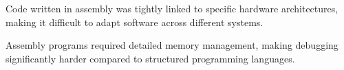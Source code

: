 \begin{NxSSSSBox}
    \begin{NxIDBox}[title={Challenges in Portability}]
        Code written in assembly was tightly linked to specific hardware architectures, making it difficult to adapt software across different systems.
    \end{NxIDBox}
    \begin{NxIDBox}[title={Complexity in Debugging}]
        Assembly programs required detailed memory management, making debugging significantly harder compared to structured programming languages.
    \end{NxIDBox}
\end{NxSSSSBox}



